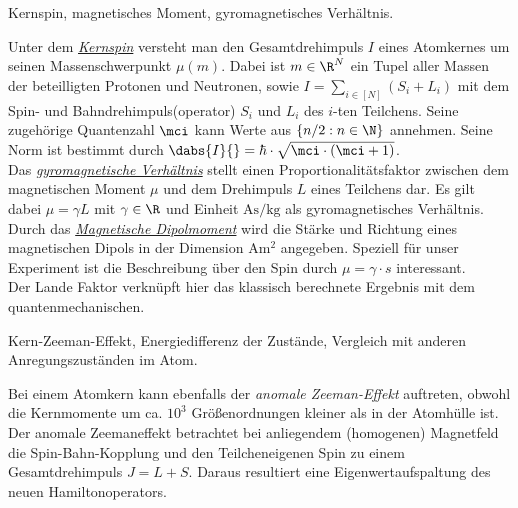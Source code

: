 \documentclass{subfiles}
\begin{document}
    \begin{Frage}
        Kernspin, magnetisches Moment, gyromagnetisches Verhältnis.
    \end{Frage}
    \begin{Antwort}
        Unter dem \href{https://de.wikipedia.org/wiki/Kernspin}{\emph{Kernspin}} versteht man den Gesamtdrehimpuls $I$ eines Atomkernes um seinen Massenschwerpunkt $\mu(m)$. Dabei ist $m\in\R^N$ ein Tupel aller Massen der beteilligten Protonen und Neutronen, sowie $I = \sum_{i\in[N]} (S_i + L_i)$ mit dem Spin- und Bahndrehimpuls(operator) $S_i$ und $L_i$ des $i$-ten Teilchens. Seine zugehörige Quantenzahl $\mci$ kann Werte aus $\{n/2:n\in\N\}$ annehmen. Seine Norm ist bestimmt durch $\dabs{I}{} = \hbar\cdot\sqrt{\mci\cdot (\mci+1)}$.\\
        
        Das \href{https://de.wikipedia.org/wiki/Gyromagnetisches_Verhältnis}{\emph{gyromagnetische Verhältnis}} stellt einen Proportionalitätsfaktor zwischen dem magnetischen Moment $\mu$ und dem Drehimpuls $L$ eines Teilchens dar. Es gilt dabei $\mu = \gamma L$ mit $\gamma\in\R$ und Einheit $\si{\ampere\second\per\kg}$ als gyromagnetisches Verhältnis.\\

        Durch das \href{https://de.wikipedia.org/wiki/Magnetisches_Dipolmoment}{\emph{Magnetische Dipolmoment}} wird die Stärke und Richtung eines magnetischen Dipols in der Dimension $\si{\ampere\metre\squared}$ angegeben. Speziell für unser Experiment ist die Beschreibung über den Spin durch $\mu = \gamma\cdot s$ interessant. \\
        Der Lande Faktor verknüpft hier das klassisch berechnete Ergebnis mit dem quantenmechanischen. 
    \end{Antwort}


    \begin{Frage}
        Kern-Zeeman-Effekt, Energiedifferenz der Zustände, Vergleich mit anderen Anregungszuständen im Atom.
    \end{Frage}
    \begin{Antwort}
        Bei einem Atomkern kann ebenfalls der \emph{anomale Zeeman-Effekt} auftreten, obwohl die Kernmomente um ca. $10^3$ Größenordnungen kleiner als in der Atomhülle ist. Der anomale Zeemaneffekt betrachtet bei anliegendem (homogenen) Magnetfeld die Spin-Bahn-Kopplung und den Teilcheneigenen Spin zu einem Gesamtdrehimpuls $J = L + S$. Daraus resultiert eine Eigenwertaufspaltung des neuen Hamiltonoperators.
    \end{Antwort}
\end{document}
